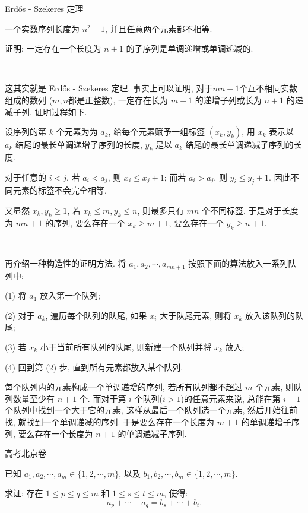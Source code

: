 \newpage
\noindent Erd\H{o}s - Szekeres 定理

一个实数序列长度为 $n^2 + 1$, 并且任意两个元素都不相等. 

证明: 一定存在一个长度为 $n + 1$ 的子序列是单调递增或单调递减的.

~

这其实就是 Erd\H{o}s - Szekeres 定理. 事实上可以证明, 对于$mn + 1$个互不相同实数组成的数列 ($m,n$都是正整数), 一定存在长为 $m+1$ 的递增子列或长为 $n+1$ 的递减子列. 证明过程如下.

设序列的第 $k$ 个元素为为 $a_k$, 给每个元素赋予一组标签 $(x_k, y_k)$, 用 $x_k$ 表示以 $a_k$ 结尾的最长单调递增子序列的长度, $y_k$ 是以 $a_k$ 结尾的最长单调递减子序列的长度. 

对于任意的 $i < j$, 若 $a_i < a_j$, 则 $x_i \le x_j + 1$; 而若 $a_i > a_j$, 则 $y_i \le y_j + 1$. 因此不同元素的标签不会完全相等. 

又显然 $x_k, y_k \ge 1$, 若 $x_k \le m, y_k \le n$, 则最多只有 $mn$ 个不同标签. 于是对于长度为 $mn + 1$ 的序列, 要么存在一个 $x_k \ge m + 1$, 要么存在一个 $y_k \ge n + 1$.

~

再介绍一种构造性的证明方法. 将 $a_1, a_2, \cdots, a_{mn+1}$ 按照下面的算法放入一系列队列中:

(1) 将 $a_1$ 放入第一个队列;

(2) 对于 $a_k$, 遍历每个队列的队尾, 如果 $x_i$ 大于队尾元素, 则将 $x_k$ 放入该队列的队尾; 

(3) 若 $x_k$ 小于当前所有队列的队尾, 则新建一个队列并将 $x_k$ 放入;

(4) 回到第 (2) 步, 直到所有元素都放入某个队列.

每个队列内的元素构成一个单调递增的序列, 若所有队列都不超过 $m$ 个元素, 则队列数量至少有 $n + 1$ 个. 而对于第 $i$ 个队列($i > 1$)的任意元素来说, 总能在第 $i - 1$ 个队列中找到一个大于它的元素, 这样从最后一个队列选一个元素, 然后开始往前找, 就找到一个单调递减的序列. 于是要么存在一个长度为 $m + 1$ 的单调递增子序列, 要么存在一个长度为 $n + 1$ 的单调递减子序列.


\newpage
 高考北京卷

已知 $a_1,a_2,\cdots,a_m\in\{1,2,\cdots,m\}$, 以及 $b_1,b_2,\cdots,b_m\in\{1,2,\cdots,m\}$. 

求证: 存在
$1\le p\le q\le m$ 和 $1\le s\le t\le m$, 使得: 
$$ a_p+\cdots+a_q=b_s+\cdots+b_t .$$

